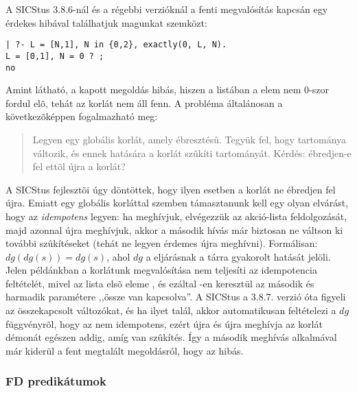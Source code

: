 A SICStus 3.8.6-nál és a régebbi verzióknál a fenti megvalósítás kapcsán egy érdekes
hibával találhatjuk magunkat szemközt:

\begin{verbatim}
| ?- L = [N,1], N in {0,2}, exactly(0, L, N).
L = [0,1], N = 0 ? ;
no
\end{verbatim}

Amint látható, a kapott megoldás hibás, hiszen a \cd{[0,1]} listában a  elem
nem 0-szor fordul elõ, tehát az  korlát nem áll fenn. A probléma
általánosan a következõképpen fogalmazható meg:

\begin{quote}
Legyen  egy globális korlát, amely 
ébresztésû. Tegyük fel, hogy  tartománya változik, és ennek hatására
a korlát szûkíti  tartományát. Kérdés: ébredjen-e fel ettõl újra a
korlát?
\end{quote}

A SICStus fejlesztõi úgy döntöttek, hogy ilyen esetben a korlát ne ébredjen fel újra.
Emiatt egy globális korláttal szemben támasztanunk kell egy olyan elvárást, hogy az
\emph{idempotens} legyen: ha meghívjuk, elvégezzük az akció-lista feldolgozását,
majd azonnal újra meghívjuk, akkor a második hívás már biztosan ne váltson ki további
szûkítéseket (tehát ne legyen érdemes újra meghívni). Formálisan: $dg(dg(s))=dg(s)$,
ahol $dg$ a  eljárásnak a tárra gyakorolt hatását jelöli.
\br
Jelen példánkban a korlátunk megvalósítása nem teljesíti az idempotencia feltételét,
mivel az  lista elsõ eleme , és ezáltal -en keresztül az 
második és harmadik paramétere ,,össze van kapcsolva''. A SICStus a 3.8.7. verzió óta
figyeli az összekapcsolt változókat, és ha ilyet talál, akkor automatikusan feltételezi
a $dg$ függvényrõl, hogy az nem idempotens, ezért újra és újra meghívja az 
korlát démonát egészen addig, amíg van szûkítés. Így a második meghívás alkalmával
már kiderül a fent megtalált megoldásról, hogy az hibás.

\subsubsection{FD predikátumok}

\label{fdpred}

